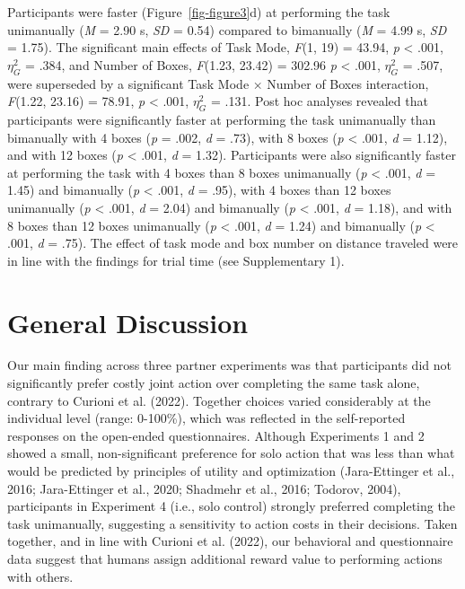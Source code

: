 \documentclass[
  11pt,
  letterpaper,
]{article}
\renewcommand{\emph}[1]{\textit{#1}}  %
\begin{document}
Participants were faster (Figure~\ref{fig-figure3}d) at performing the
task unimanually (\emph{M} = 2.90 s, \emph{SD} = 0.54) compared to
bimanually (\emph{M} = 4.99 s, \emph{SD} = 1.75). The significant main
effects of Task Mode, \emph{F}(1, 19) = 43.94, \emph{p} \textless{}
.001, \(\eta_{G}^{2}\) = .384, and Number of Boxes, \emph{F}(1.23,
23.42) = 302.96 \emph{p} \textless{} .001, \(\eta_{G}^{2}\) = .507, were
superseded by a significant Task Mode × Number of Boxes interaction,
\emph{F}(1.22, 23.16) = 78.91, \emph{p} \textless{} .001,
\(\eta_{G}^{2}\) = .131. Post hoc analyses revealed that participants
were significantly faster at performing the task unimanually than
bimanually with 4 boxes (\emph{p} = .002, \emph{d} = .73), with 8 boxes
(\emph{p} \textless{} .001, \emph{d} = 1.12), and with 12 boxes
(\emph{p} \textless{} .001, \emph{d} = 1.32). Participants were also
significantly faster at performing the task with 4 boxes than 8 boxes
unimanually (\emph{p} \textless{} .001, \emph{d} = 1.45) and bimanually
(\emph{p} \textless{} .001, \emph{d} = .95), with 4 boxes than 12 boxes
unimanually (\emph{p} \textless{} .001, \emph{d} = 2.04) and bimanually
(\emph{p} \textless{} .001, \emph{d} = 1.18), and with 8 boxes than 12
boxes unimanually (\emph{p} \textless{} .001, \emph{d} = 1.24) and
bimanually (\emph{p} \textless{} .001, \emph{d} = .75). The effect of
task mode and box number on distance traveled were in line with the
findings for trial time (see Supplementary 1).

\section{General Discussion}\label{general-discussion}

Our main finding across three partner experiments was that participants
did not significantly prefer costly joint action over completing the
same task alone, contrary to Curioni et al. (2022). Together choices
varied considerably at the individual level (range: 0-100\%), which was
reflected in the self-reported responses on the open-ended
questionnaires. Although Experiments 1 and 2 showed a small,
non-significant preference for solo action that was less than what would
be predicted by principles of utility and optimization (Jara-Ettinger et
al., 2016; Jara-Ettinger et al., 2020; Shadmehr et al., 2016; Todorov,
2004), participants in Experiment 4 (i.e., solo control) strongly
preferred completing the task unimanually, suggesting a sensitivity to
action costs in their decisions. Taken together, and in line with
Curioni et al. (2022), our behavioral and questionnaire data suggest
that humans assign additional reward value to performing actions with
others.
\end{document}
